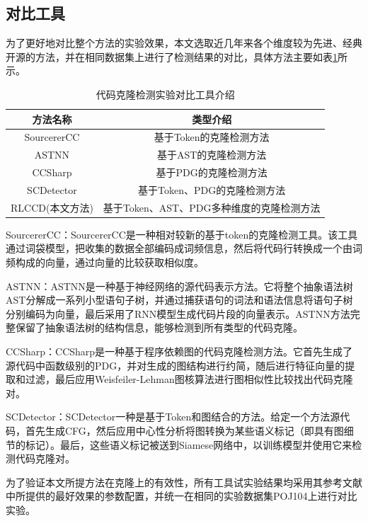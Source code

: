 \subsection{对比工具}

为了更好地对比整个方法的实验效果，本文选取近几年来各个维度较为先进、经典开源的方法，并在相同数据集上进行了检测结果的对比，具体方法主要如表\ref{tab:tool}所示。

\begin{table}[htp]
  \centering
  \caption{代码克隆检测实验对比工具介绍} 
  \label{tab:tool}
  \renewcommand{\arraystretch}{1.1}
  \begin{tabular*}{0.8\textwidth}{@{\extracolsep{\fill}}cc}
  \toprule
    方法名称			&类型介绍		\\
  \midrule
  SourcererCC		 &基于Token的克隆检测方法 \\
  ASTNN			     &基于AST的克隆检测方法 \\
  CCSharp		     &基于PDG的克隆检测方法 \\
  SCDetector		 &基于Token、PDG的克隆检测方法 \\
  RLCCD(本文方法)	&基于Token、AST、PDG多种维度的克隆检测方法 \\
  \bottomrule
  \end{tabular*}
\end{table}

SourcererCC\cite{7886988}：SourcererCC是一种相对较新的基于token的克隆检测工具。该工具通过词袋模型，把收集的数据全部编码成词频信息，然后将代码行转换成一个由词频构成的向量，通过向量的比较获取相似度。

ASTNN\cite{8812062}：ASTNN是一种基于神经网络的源代码表示方法。它将整个抽象语法树AST分解成一系列小型语句子树，并通过捕获语句的词法和语法信息将语句子树分别编码为向量，最后采用了RNN模型生成代码片段的向量表示。ASTNN方法完整保留了抽象语法树的结构信息，能够检测到所有类型的代码克隆。

CCSharp\cite{9286111}：CCSharp是一种基于程序依赖图的代码克隆检测方法。它首先生成了源代码中函数级别的PDG，并对生成的图结构进行约简，随后进行特征向量的提取和过滤，最后应用Weisfeiler-Lehman图核算法进行图相似性比较找出代码克隆对。

SCDetector\cite{10.1145/3324884.3416562}：SCDetector一种是基于Token和图结合的方法。给定一个方法源代码，首先生成CFG，然后应用中心性分析将图转换为某些语义标记（即具有图细节的标记）。最后，这些语义标记被送到Siamese网络中，以训练模型并使用它来检测代码克隆对。

为了验证本文所提方法在克隆上的有效性，所有工具试实验结果均采用其参考文献中所提供的最好效果的参数配置，并统一在相同的实验数据集POJ104上进行对比实验。

